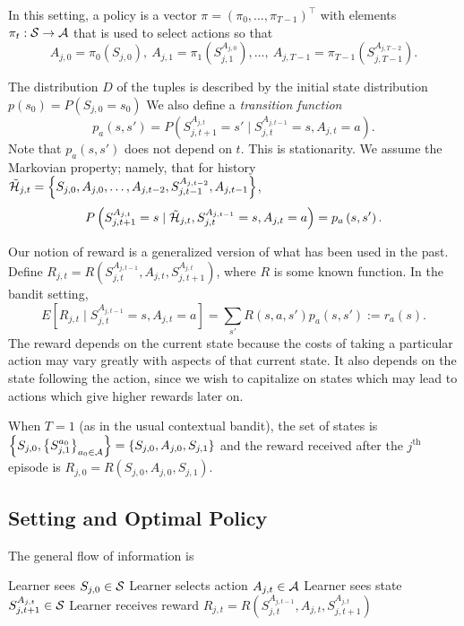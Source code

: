 \documentclass[11pt]{article}
\begin{document}
In this setting, a policy is a vector $\pi = \left(\pi_{0}, \ldots, \pi_{T-1}\right)^\top$ with elements $\pi_{t}: \mathcal{S}\to\mathcal{A}$ that is used to select actions so that
\[
	A_{j,0} = \pi_{0}\left(S_{j,0}\right), \ A_{j,1} = \pi_{1}\left(S_{j,1}^{A_{j,0}}\right), \ldots, \ A_{j,T-1} = \pi_{T-1}\left(S_{j,T-1}^{A_{j,T-2}}\right).
\]

The distribution $D$ of the tuples is described by the initial state distribution $p(s_{0}) = P\left(S_{j,0}=s_{0}\right)$ We also define a \textit{transition function}
\[
	p_{a}\left(s, s'\right) = P\left(S_{j,t+1}^{A_{j,t}} = s' \mid S_{j,t}^{A_{j,t-1}} = s, A_{j,t} = a\right).
\]
Note that $p_{a}(s,s')$ does not depend on $t$. This is stationarity. We assume the Markovian property; namely, that for history $\tilde{\mathcal{H}}_{j,t} = \left\{S_{j,0}, A_{j,0}, \ldots, A_{j,t-2}, S_{j,t-1}^{A_{j,t-2}}, A_{j,t-1} \right\}$, 
\[
	P\left(S_{j,t+1}^{A_{j,t}} =s \mid \tilde{\mathcal{H}}_{j,t}, S_{j,t}^{A_{j,t-1}} = s, A_{j,t} = a\right) = p_{a}\left(s,s'\right).
\]

Our notion of reward is a generalized version of what has been used in the past. Define $R_{j,t} = R\left(S_{j, t}^{A_{j,t-1}}, A_{j,t}, S_{j,t+1}^{A_{j,t}}\right)$, where $R$ is some known function. In the bandit setting,
\[
	E\left[R_{j,t}\mid S_{j,t}^{A_{j,t-1}} = s, A_{j,t} = a\right] = \sum_{s'} R(s, a, s') p_{a}(s,s') := r_{a}(s). 
\]
The reward depends on the current state because the costs of taking a particular action may vary greatly with aspects of that current state. It also depends on the state following the action, since we wish to capitalize on states which may lead to actions which give higher rewards later on.

When $T = 1$ (as in the usual contextual bandit), the set of states is $\left\{S_{j,0}, \left\{S_{j,1}^{a_{0}}\right\}_{a_{0}\in\mathcal{A}}\right\} = \left\{S_{j,0}, A_{j,0}, S_{j,1}\right\}$ and the reward received after the $j^{\text{th}}$ episode is $R_{j,0} = R\left(S_{j,0}, A_{j,0}, S_{j,1}\right)$.

\subsection{Setting and Optimal Policy}
The general flow of information is 
\begin{algorithmic}[1]
	\STATE Learner sees $S_{j,0}\in \mathcal{S}$
	\STATE Learner selects action $A_{j,t}\in\mathcal{A}$
	\STATE Learner sees state $S_{j,t+1}^{A_{j,t}} \in \mathcal{S}$
	\STATE Learner receives reward $R_{j,t} = R\left(S_{j,t}^{A_{j,t-1}}, A_{j,t}, S_{j,t+1}^{A_{j,t}}\right)$
	\ENDFOR
	\ENDFOR
\end{algorithmic}
\end{document}
